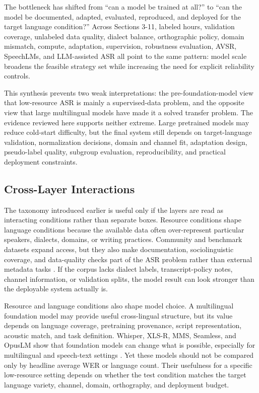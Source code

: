 \documentclass[pdflatex,sn-basic,iicol]{sn-jnl}
\theoremstyle{thmstyleone}
\theoremstyle{thmstyletwo}
\theoremstyle{thmstylethree}
\begin{document}
The bottleneck has shifted from ``can a model be trained at all?'' to ``can the model be documented, adapted, evaluated, reproduced, and deployed for the target language condition?'' Across Sections 3-11, labeled hours, validation coverage, unlabeled data quality, dialect balance, orthographic policy, domain mismatch, compute, adaptation, supervision, robustness evaluation, AVSR, SpeechLMs, and LLM-assisted ASR all point to the same pattern: model scale broadens the feasible strategy set while increasing the need for explicit reliability controls.

This synthesis prevents two weak interpretations: the pre-foundation-model view that low-resource ASR is mainly a supervised-data problem, and the opposite view that large multilingual models have made it a solved transfer problem. The evidence reviewed here supports neither extreme. Large pretrained models may reduce cold-start difficulty, but the final system still depends on target-language validation, normalization decisions, domain and channel fit, adaptation design, pseudo-label quality, subgroup evaluation, reproducibility, and practical deployment constraints.

\subsection{Cross-Layer Interactions}

The taxonomy introduced earlier is useful only if the layers are read as interacting conditions rather than separate boxes. Resource conditions shape language conditions because the available data often over-represent particular speakers, dialects, domains, or writing practices. Community and benchmark datasets expand access, but they also make documentation, sociolinguistic coverage, and data-quality checks part of the ASR problem rather than external metadata tasks \citep{ardila2020commonvoice,conneau2022fleurs,lau2025_data_quality_multilingual_speech}. If the corpus lacks dialect labels, transcript-policy notes, channel information, or validation splits, the model result can look stronger than the deployable system actually is.

Resource and language conditions also shape model choice. A multilingual foundation model may provide useful cross-lingual structure, but its value depends on language coverage, pretraining provenance, script representation, acoustic match, and task definition. Whisper, XLS-R, MMS, Seamless, and OpusLM show that foundation models can change what is possible, especially for multilingual and speech-text settings \citep{babu22_interspeech,pmlr-v202-radford23a,pratap2024mms,seamless2025_joint_speech_text_mt,tian25b_interspeech}. Yet these models should not be compared only by headline average WER or language count. Their usefulness for a specific low-resource setting depends on whether the test condition matches the target language variety, channel, domain, orthography, and deployment budget.
\end{document}
